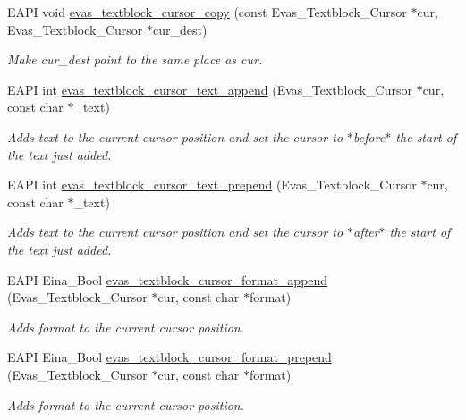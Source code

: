 \begin{DoxyCompactItemize}
EAPI void \hyperlink{group__Evas__Object__Textblock_gadeff0745dac418696bdd9a380ad54e9a}{evas\_\-textblock\_\-cursor\_\-copy} (const Evas\_\-Textblock\_\-Cursor $\ast$cur, Evas\_\-Textblock\_\-Cursor $\ast$cur\_\-dest)
\begin{DoxyCompactList}\small\item\em Make cur\_\-dest point to the same place as cur. \item\end{DoxyCompactList}\item 
EAPI int \hyperlink{group__Evas__Object__Textblock_ga674d0cf1c0273fa58f1f2b4007b0b455}{evas\_\-textblock\_\-cursor\_\-text\_\-append} (Evas\_\-Textblock\_\-Cursor $\ast$cur, const char $\ast$\_\-text)
\begin{DoxyCompactList}\small\item\em Adds text to the current cursor position and set the cursor to $\ast$before$\ast$ the start of the text just added. \item\end{DoxyCompactList}\item 
EAPI int \hyperlink{group__Evas__Object__Textblock_gacc79760e60e2aa49cb5c2aaa8bb73ba0}{evas\_\-textblock\_\-cursor\_\-text\_\-prepend} (Evas\_\-Textblock\_\-Cursor $\ast$cur, const char $\ast$\_\-text)
\begin{DoxyCompactList}\small\item\em Adds text to the current cursor position and set the cursor to $\ast$after$\ast$ the start of the text just added. \item\end{DoxyCompactList}\item 
EAPI Eina\_\-Bool \hyperlink{group__Evas__Object__Textblock_ga6c8336913e645d5bedbc93ba7d06d079}{evas\_\-textblock\_\-cursor\_\-format\_\-append} (Evas\_\-Textblock\_\-Cursor $\ast$cur, const char $\ast$format)
\begin{DoxyCompactList}\small\item\em Adds format to the current cursor position. \item\end{DoxyCompactList}\item 
EAPI Eina\_\-Bool \hyperlink{group__Evas__Object__Textblock_ga7e819b359a7e12cb3ecf3357029b9cb6}{evas\_\-textblock\_\-cursor\_\-format\_\-prepend} (Evas\_\-Textblock\_\-Cursor $\ast$cur, const char $\ast$format)
\begin{DoxyCompactList}\small\item\em Adds format to the current cursor position. \item\end{DoxyCompactList}\item 

\end{DoxyCompactItemize}
